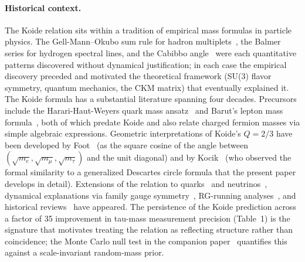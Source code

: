 %
%
%
%
%

\paragraph{Historical context.}
The Koide relation sits within a tradition of empirical mass formulas
in particle physics. The Gell-Mann--Okubo sum rule for hadron
multiplets~\cite{GellMann1961,Okubo1962}, the Balmer series for
hydrogen spectral lines, and the Cabibbo angle~\cite{Cabibbo1963}
were each quantitative patterns discovered without dynamical
justification; in each case the empirical discovery preceded and
motivated the theoretical framework (SU(3) flavor symmetry,
quantum mechanics, the CKM matrix) that eventually explained it.
The Koide formula has a substantial literature spanning four
decades. Precursors include the Harari-Haut-Weyers quark mass
ansatz~\cite{HarariHautWeyers1978} and Barut's lepton mass
formula~\cite{Barut1979}, both of which predate Koide and also
relate charged fermion masses via simple algebraic expressions.
Geometric interpretations of Koide's $Q = 2/3$ have been developed
by Foot~\cite{Foot1994} (as the square cosine of the angle between
$(\sqrt{m_e}, \sqrt{m_\mu}, \sqrt{m_\tau})$ and the unit diagonal)
and by Kocik~\cite{Kocik2012} (who observed the formal similarity
to a generalized Descartes circle formula that the present paper
develops in detail). Extensions of the relation to
quarks~\cite{Kartavtsev2011,LiMa2016} and
neutrinos~\cite{RodejohannZhang2011,Cao2012}, dynamical
explanations via family gauge symmetry~\cite{Sumino2009a,Sumino2009b},
RG-running analyses~\cite{XingZhang2006,LiMa2016}, and
historical reviews~\cite{RiveroGsponer2005} have appeared.  The
persistence of the Koide prediction across a factor of 35
improvement in tau-mass measurement precision (Table~1) is the
signature that motivates treating the relation as reflecting
structure rather than coincidence; the Monte Carlo null test in
the companion paper~\cite{BrilliantMC2026} quantifies this
against a scale-invariant random-mass prior.

